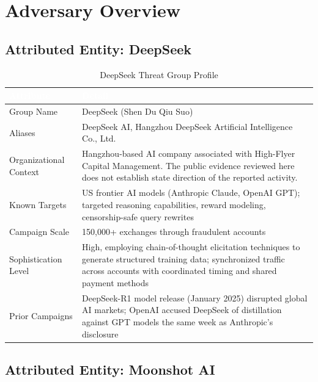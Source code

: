 \documentclass[11pt,a4paper]{article}
\begin{document}
\newpage

\section{Adversary Overview}

\subsection{Attributed Entity: DeepSeek}

\begin{table}[H]
\centering
\renewcommand{\arraystretch}{1.3}
\begin{tabularx}{\textwidth}{|L{4.5cm}|X|}
\hline
{}
\textcolor{white}{\textbf{Attribute}} & \textcolor{white}{\textbf{Detail}} \\
\hline
Group Name & DeepSeek (Shen Du Qiu Suo) \\
\hline
Aliases & DeepSeek AI, Hangzhou DeepSeek Artificial Intelligence Co., Ltd. \\
\hline
Organizational Context & Hangzhou-based AI company associated with High-Flyer Capital Management. The public evidence reviewed here does not establish state direction of the reported activity. \\
\hline
Known Targets & US frontier AI models (Anthropic Claude, OpenAI GPT); targeted reasoning capabilities, reward modeling, censorship-safe query rewrites \\
\hline
Campaign Scale & 150,000+ exchanges through fraudulent accounts \cite{anthropic_blog} \\
\hline
Sophistication Level & High, employing chain-of-thought elicitation techniques to generate structured training data; synchronized traffic across accounts with coordinated timing and shared payment methods \cite{anthropic_blog}\cite{treblle} \\
\hline
Prior Campaigns & DeepSeek-R1 model release (January 2025) disrupted global AI markets; OpenAI accused DeepSeek of distillation against GPT models the same week as Anthropic's disclosure \cite{reuters_alibaba}\cite{linkedin_keltner} \\
\hline
\end{tabularx}
\caption{DeepSeek Threat Group Profile}
\label{tab:deepseek}
\end{table}

\subsection{Attributed Entity: Moonshot AI}
\end{document}
